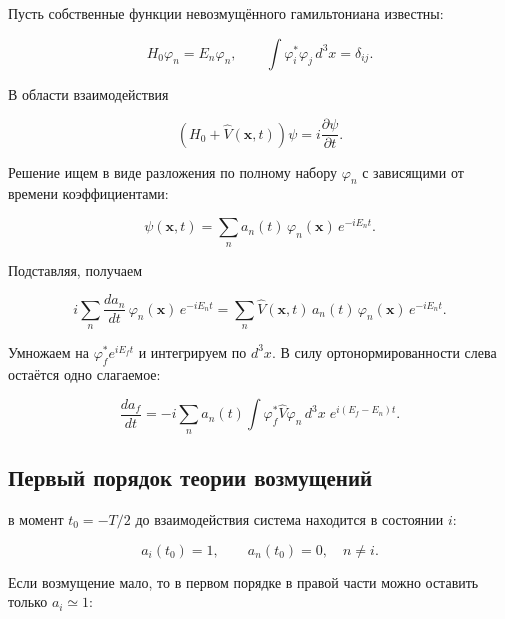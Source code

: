 \documentclass[../final.tex]{subfiles}
\begin{document}
Пусть собственные функции невозмущённого гамильтониана известны:

\begin{equation*}
    H_0\varphi_n=E_n\varphi_n,
    \qquad
    \int\varphi_i^*\varphi_j\,d^3x=\delta_{ij}.
\end{equation*}

В области взаимодействия

\begin{equation*}
    \left(H_0+\hat V(\mathbf x,t)\right)\psi
    =
    i\frac{\partial\psi}{\partial t}.
\end{equation*}

Решение ищем в виде разложения по полному набору $\varphi_n$
с зависящими от времени коэффициентами:

\begin{equation*}
    \psi(\mathbf x,t)
    =
    \sum_n a_n(t)\,\varphi_n(\mathbf x)\,e^{-iE_nt}.
\end{equation*}

Подставляя, получаем

\begin{equation*}
    i\sum_n
    \frac{da_n}{dt}\,
    \varphi_n(\mathbf x)\,e^{-iE_nt}
    =
    \sum_n
    \hat V(\mathbf x,t)\,a_n(t)\,\varphi_n(\mathbf x)\,e^{-iE_nt}.
\end{equation*}

Умножаем на $\varphi_f^*e^{iE_ft}$ и интегрируем по $d^3x$.
В силу ортонормированности слева остаётся одно слагаемое:

\begin{equation*}
    \frac{da_f}{dt}
    =
    -i\sum_n a_n(t)
    \int\varphi_f^*\hat V\varphi_n\,d^3x\;
    e^{i(E_f-E_n)t}.
\end{equation*}


\subsection{Первый порядок теории возмущений}

 в момент $t_0=-T/2$ до взаимодействия
система находится в состоянии $i$:

\begin{equation*}
    a_i(t_0)=1,
    \qquad
    a_n(t_0)=0,\quad n\neq i.
\end{equation*}

Если возмущение мало, то в первом порядке в правой части можно
оставить только $a_i\simeq1$:
\end{document}
